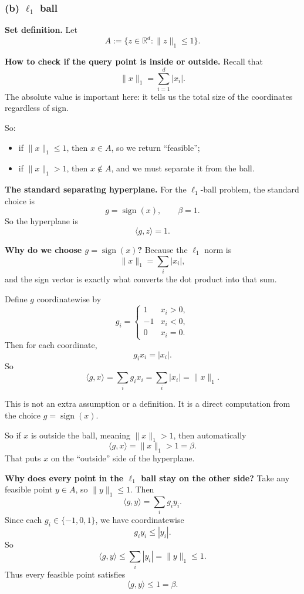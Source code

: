 \documentclass[10pt]{article}
\begin{document}
\subsubsection*{(b) $\ell_1$ ball}

\textbf{Set definition.}
Let
\[
A := \{z\in\mathbb{R}^d : \|z\|_1 \le 1\}.
\]

\medskip
\textbf{How to check if the query point is inside or outside.}
Recall that
\[
\|x\|_1 = \sum_{i=1}^d |x_i|.
\]
The absolute value is important here: it tells us the total size of the coordinates regardless of sign.

So:
\begin{itemize}
\item if \(\|x\|_1 \le 1\), then \(x\in A\), so we return ``feasible'';
\item if \(\|x\|_1 > 1\), then \(x\notin A\), and we must separate it from the ball.
\end{itemize}

\medskip
\textbf{The standard separating hyperplane.}
For the \(\ell_1\)-ball problem, the standard choice is
\[
g = \operatorname{sign}(x),
\qquad
\beta = 1.
\]
So the hyperplane is
\[
\boxed{\langle g,z\rangle = 1.}
\]

\medskip
\textbf{Why do we choose \(g=\operatorname{sign}(x)\)?}
Because the \(\ell_1\) norm is
\[
\|x\|_1 = \sum_i |x_i|,
\]
and the sign vector is exactly what converts the dot product into that sum.

Define \(g\) coordinatewise by
\[
g_i =
\begin{cases}
1 & x_i>0,\\
-1 & x_i<0,\\
0 & x_i=0.
\end{cases}
\]
Then for each coordinate,
\[
g_i x_i = |x_i|.
\]
So
\[
\langle g,x\rangle
=
\sum_i g_i x_i
=
\sum_i |x_i|
=
\|x\|_1.
\]

This is not an extra assumption or a definition. It is a direct computation from the choice \(g=\operatorname{sign}(x)\).

So if \(x\) is outside the ball, meaning \(\|x\|_1>1\), then automatically
\[
\langle g,x\rangle = \|x\|_1 > 1 = \beta.
\]
That puts \(x\) on the ``outside'' side of the hyperplane.

\medskip
\textbf{Why does every point in the \(\ell_1\) ball stay on the other side?}
Take any feasible point \(y\in A\), so \(\|y\|_1\le 1\). Then
\[
\langle g,y\rangle = \sum_i g_i y_i.
\]
Since each \(g_i\in\{-1,0,1\}\), we have coordinatewise
\[
g_i y_i \le |y_i|.
\]
So
\[
\langle g,y\rangle
\le \sum_i |y_i|
= \|y\|_1
\le 1.
\]
Thus every feasible point satisfies
\[
\langle g,y\rangle \le 1 = \beta.
\]
\end{document}
